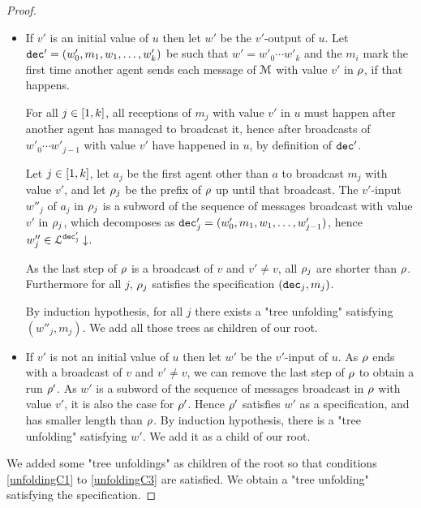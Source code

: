 \begin{proof}
	\begin{itemize}
		\item If $v'$ is an initial value of $u$ then let $w'$ be the $v'$-output of $u$. Let $\mathtt{dec}' = (w'_0, m_1, w_1, \ldots, w'_k)$ be such that $w' = w'_0 \cdots w'_k$ and the $m_i$ mark the first time another agent sends each message of $\mathcal{M}$ with value $v'$ in $\rho$, if that happens.  
		
		For all $j \in [1,k]$, all receptions of $m_j$ with value $v'$ in $u$ must happen after another agent has managed to broadcast it, hence after broadcasts of $w'_0 \cdots w'_{j-1}$ with value $v'$ have happened in $u$, by definition of $\mathtt{dec}'$.
		
		Let $j \in [1,k]$, let $a_j$ be the first agent other than $a$ to broadcast $m_j$ with value $v'$, and let $\rho_j$ be the prefix of $\rho$ up until that broadcast. The $v'$-input $w''_j$ of $a_j$ in $\rho_j$ is a subword of the sequence of messages broadcast with value $v'$ in $\rho_j$, which decomposes as $\mathtt{dec}'_j = (w'_0, m_1, w_1, \ldots, w'_{j-1})$, hence $w''_j \in \mathcal{L}^{\mathtt{\mathtt{dec}'_j}}\downarrow$.
		
		As the last step of $\rho$ is a broadcast of $v$ and $v' \neq v$, all $\rho_j$ are shorter than $\rho$. Furthermore for all $j$, $\rho_j$ satisfies the specification $(\mathtt{dec}_j, m_j)$.		
		
		By induction hypothesis, for all $j$ there exists a "tree unfolding" satisfying $(w''_j, m_j)$. We add all those trees as children of our root.
		
		\item If $v'$ is not an initial value of $u$ then let $w'$ be the $v'$-input of $u$. 
		As $\rho$ ends with a broadcast of $v$ and $v' \neq v$, we can remove the last step of $\rho$ to obtain a run $\rho'$. As $w'$ is a subword of the sequence of messages broadcast in $\rho$ with value $v'$, it is also the case for $\rho'$.
		Hence $\rho'$ satisfies $w'$ as a specification, and has smaller length than $\rho$. By induction hypothesis, there is a "tree unfolding" satisfying $w'$. We add it as a child of our root.
	\end{itemize}
	
	We added some "tree unfoldings" as children of the root so that conditions \ref{unfoldingC1} to \ref{unfoldingC3} are satisfied. We obtain a "tree unfolding" satisfying the specification.
\end{proof}
